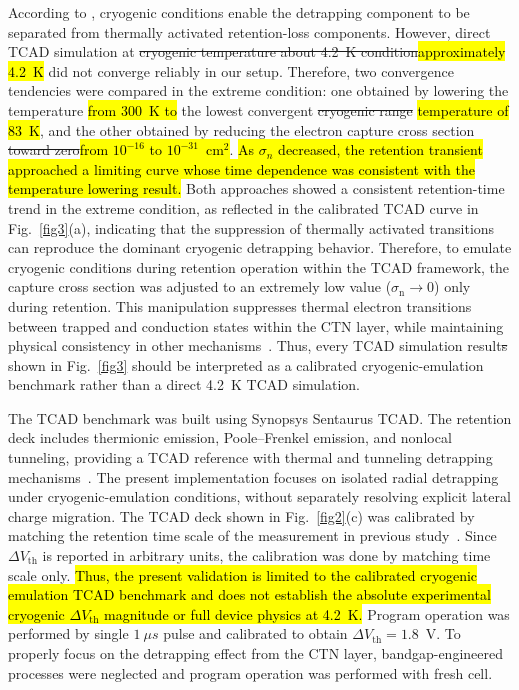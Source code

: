 \documentclass[journal,twoside,web]{ieeecolor}
\begin{document}
According to \cite{Refaldi.IRPS2025}, cryogenic conditions enable the detrapping component to be {separated from thermally activated retention-loss components}.
However, direct TCAD simulation at \sout{cryogenic temperature about 4.2~K condition}\hl{approximately 4.2~K} did not converge reliably in our setup.
{Therefore, two convergence tendencies were compared in the extreme condition: one obtained by lowering the temperature \hl{from 300~K to} the lowest convergent \sout{cryogenic range} \hl{temperature of 83~K}, and the other obtained by reducing the electron capture cross section \sout{toward zero}\hl{from $10^{-16}$ to $10^{-31}$~cm$^2$}.}
\hl{As $\sigma_n$ decreased, the retention transient approached a limiting curve whose time dependence was consistent with the temperature lowering result.}
{Both approaches showed a consistent retention-time trend in the extreme condition, as reflected in the calibrated TCAD curve in Fig.~\ref{fig3}(a), indicating that the suppression of thermally activated transitions can reproduce the dominant cryogenic detrapping behavior.}
Therefore, to emulate cryogenic conditions during retention operation within the TCAD framework, the capture cross section was adjusted to an extremely low value ($\sigma_\mathrm{n} \rightarrow 0$) only during retention.
This manipulation suppresses thermal electron transitions between trapped and conduction states within the CTN layer, while maintaining physical consistency in other mechanisms~\cite{TCADmanual.2022}.
{Thus, every TCAD simulation result\sout{s} shown in \hbox{Fig.~\ref{fig3}} should be interpreted as a calibrated cryogenic-emulation benchmark rather than a direct 4.2~K TCAD simulation.}

{The TCAD benchmark was built using Synopsys Sentaurus TCAD.}
{The retention deck includes thermionic emission, Poole--Frenkel emission, and nonlocal tunneling, providing a TCAD reference with thermal and tunneling detrapping mechanisms~\hbox{\cite{TCADmanual.2022}}.}
{The present implementation focuses on isolated radial detrapping under cryogenic-emulation conditions, without separately resolving explicit lateral charge migration.}
The TCAD deck shown in Fig.~\ref{fig2}(c) was calibrated by matching the retention time scale of the measurement in previous study~\cite{Refaldi.IRPS2025}.
Since $\Delta V_\text{th}$ is reported in arbitrary units, the calibration was done by matching time scale only.
\hl{Thus, the present validation is limited to the calibrated cryogenic emulation TCAD benchmark and does not establish the absolute experimental cryogenic $\Delta V_\text{th}$ magnitude or full device physics at 4.2~K.}
Program operation was performed by single $1~\mu s$ pulse and calibrated to obtain $\Delta V_\text{th} = 1.8$~V.
To properly focus on the detrapping effect from the CTN layer, bandgap-engineered processes were neglected and program operation was performed with fresh cell.
\end{document}
